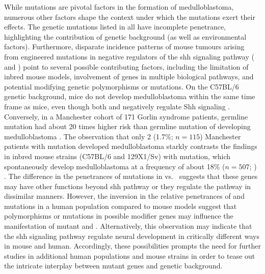 While mutations are pivotal factors in the formation of medulloblastoma, numerous other factors shape the context under which the mutations exert their effects. The genetic mutations listed in  all have incomplete penetrance, highlighting the contribution of genetic background (as well as environmental factors). Furthermore, disparate incidence patterns of mouse tumours arising from engineered mutations in negative regulators of the \gls{shh} signaling pathway ( and ) point to several possible contributing factors, including the limitation of inbred mouse models, involvement of genes in multiple biological pathways, and potential modifying genetic polymorphisms or mutations. On the C57BL/6 genetic background, \high{+/-} mice do not develop medulloblastoma within the same time frame as \high{+/-} mice, even though both  and  negatively regulate Shh signaling . Conversely, in a Manchester cohort of 171 Gorlin syndrome patients, germline  mutation had about 20 times higher risk than germline  mutation of developing medulloblastoma . The observation that only 2 (1.7\%; $n = 115$) Manchester patients with  mutation developed medulloblastoma  starkly contrasts the findings in inbred mouse strains (C57BL/6 and 129X1/Sv) with  mutation, which spontaneously develop medulloblastoma at a frequency of about 18\% ($n = 507$; ) . The difference in the penetrances of mutations in  vs.\  suggests that these genes may have other functions beyond \gls{shh} pathway or they regulate the pathway in dissimilar manners. However, the inversion in the relative penetrances of  and  mutations in a human population compared to mouse models suggest that polymorphisms or mutations in possible modifier genes may influence the manifestation of mutant  and . Alternatively, this observation may indicate that the \gls{shh} signaling pathway regulate neural development in critically different ways in mouse and human. Accordingly, these possibilities prompts the need for further studies in additional human populations and mouse strains in order to tease out the intricate interplay between mutant genes and genetic background. 

